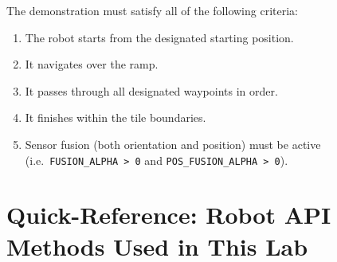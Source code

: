 \documentclass[12pt,letterpaper]{article}
\begin{document}
The demonstration must satisfy all of the following criteria:

\begin{enumerate}
  \item The robot starts from the designated starting position.
  \item It navigates over the ramp.
  \item It passes through all designated waypoints in order.
  \item It finishes within the tile boundaries.
  \item Sensor fusion (both orientation and position) must be active
        (i.e.\ \texttt{FUSION\_ALPHA~>~0} and \texttt{POS\_FUSION\_ALPHA~>~0}).
\end{enumerate}


\newpage

\appendix
\section{Quick-Reference: Robot API Methods Used in This Lab}
\end{document}
